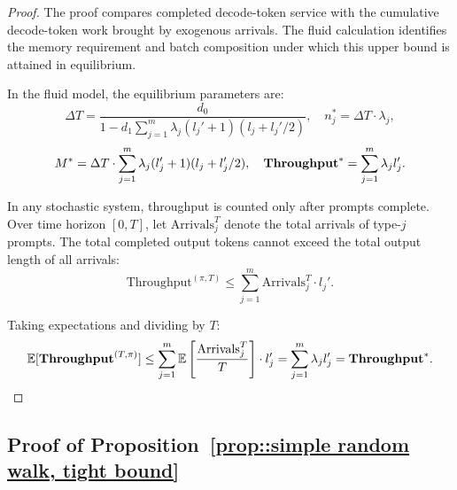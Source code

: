 \begin{proof}
The proof compares completed decode-token service with the cumulative decode-token work brought by exogenous arrivals. The fluid calculation identifies the memory requirement and batch composition under which this upper bound is attained in equilibrium.

In the fluid model, the equilibrium parameters are:
$$\Delta T = \frac{d_0}{1 - d_1\sum_{j=1}^m \lambda_j(l_j'+1)(l_j + l_j'/2)}, \quad n_j^* = \Delta T \cdot \lambda_j,$$
$$M^* = \Delta T \cdot \sum_{j=1}^m \lambda_j(l_j'+1)(l_j + l_j'/2), \quad \textbf{Throughput}^* = \sum_{j=1}^m \lambda_j l_j'.$$

In any stochastic system, throughput is counted only after prompts complete. Over time horizon $[0,T]$, let $\text{Arrivals}_j^T$ denote the total arrivals of type-$j$ prompts. The total completed output tokens cannot exceed the total output length of all arrivals:
$$\text{Throughput}^{(\pi,T)} \leq \sum_{j=1}^m \text{Arrivals}_j^T \cdot l_j'.$$

Taking expectations and dividing by $T$:
$$\mathbb{E}[\textbf{Throughput}^{(T,\pi)}] \leq \sum_{j=1}^m \mathbb{E}\left[\frac{\text{Arrivals}_j^T}{T}\right] \cdot l_j' = \sum_{j=1}^m \lambda_j l_j' = \textbf{Throughput}^*.$$
\end{proof}

\subsection{Proof of Proposition~\ref{prop::simple random walk, tight bound}}
\label{appendix:proof_boundary_delay_lower_bound}


